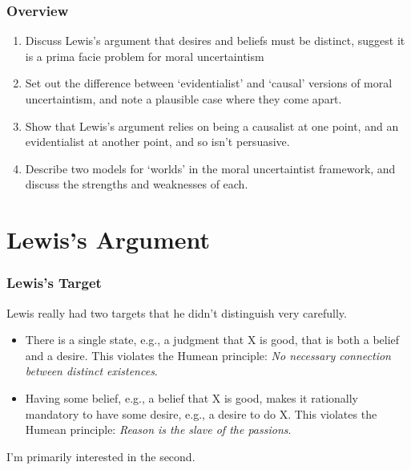 
\def\mytitle{Moral Uncertainty and Desire as Belief}
\def\myauthor{Brian Weatherson}
\def\mydate{June, 2018}


\begin{frame}[fragile]
\frametitle{Overview}
\label{overview}

\begin{enumerate}
\item{} Discuss Lewis's argument that desires and beliefs must be distinct, suggest it is a prima facie problem for moral uncertaintism

\item{} Set out the difference between `evidentialist' and `causal' versions of moral uncertaintism, and note a plausible case where they come apart.

\item{} Show that Lewis's argument relies on being a causalist at one point, and an evidentialist at another point, and so isn't persuasive.

\item{} Describe two models for `worlds' in the moral uncertaintist framework, and discuss the strengths and weaknesses of each.

\end{enumerate}

\end{frame}

\section{Lewis's Argument}
\label{lewissargument}

\begin{frame}[fragile]
\frametitle{Lewis's Target}
\label{lewisstarget}

Lewis really had two targets that he didn't distinguish very carefully.

\begin{itemize}
\item{} There is a single state, e.g., a judgment that X is good, that is both a belief and a desire. This violates the Humean principle: \emph{No necessary connection between distinct existences}. \pause 

\item{} Having some belief, e.g., a belief that X is good, makes it rationally mandatory to have some desire, e.g., a desire to do X. This violates the Humean principle: \emph{Reason is the slave of the passions}. \pause 

\end{itemize}

I'm primarily interested in the second.

\end{frame}

